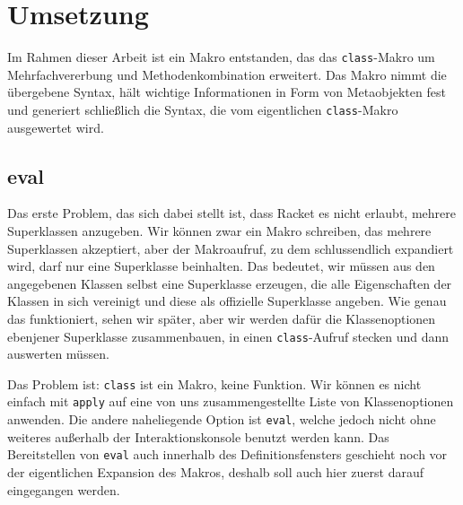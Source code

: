 
\pagestyle{diplHeadings}





\setcounter{page}{1}
\tableofcontents
\cleardoublepage 

\setcounter{page}{1} 
\mainmatter  
{}

 

 





\chapter{Umsetzung}  
\label{implementation}
Im Rahmen dieser Arbeit ist ein Makro entstanden, das das \texttt{class}-Makro um Mehrfachvererbung und Methodenkombination erweitert. Das Makro nimmt die übergebene Syntax, hält wichtige Informationen in Form von Metaobjekten fest und generiert schließlich die Syntax, die vom eigentlichen \texttt{class}-Makro ausgewertet wird.

\section{eval}

Das erste Problem, das sich dabei stellt ist, dass Racket es nicht erlaubt, mehrere Superklassen anzugeben. Wir können zwar ein Makro schreiben, das mehrere Superklassen akzeptiert, aber der Makroaufruf, zu dem schlussendlich expandiert wird, darf nur eine Superklasse beinhalten. Das bedeutet, wir müssen aus den angegebenen Klassen selbst eine Superklasse erzeugen, die alle Eigenschaften der Klassen in sich vereinigt und diese als offizielle Superklasse angeben. Wie genau das funktioniert, sehen wir später, aber wir werden dafür die Klassenoptionen ebenjener Superklasse zusammenbauen, in einen \texttt{class}-Aufruf stecken und dann auswerten müssen.

Das Problem ist: \texttt{class} ist ein Makro, keine Funktion. Wir können es nicht einfach mit \texttt{apply} auf eine von uns zusammengestellte Liste von Klassenoptionen anwenden. Die andere naheliegende Option ist \texttt{eval}, welche jedoch nicht ohne weiteres außerhalb der Interaktionskonsole benutzt werden kann. Das Bereitstellen von \texttt{eval} auch innerhalb des Definitionsfensters geschieht noch vor der eigentlichen Expansion des Makros, deshalb soll auch hier zuerst darauf eingegangen werden.

